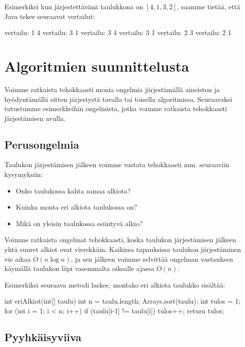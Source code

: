 Esimerkiksi kun järjestettävänä taulukkona on $[4,1,3,2]$,
saamme tietää, että Java tekee seuraavat vertailut:

\begin{code}
vertailu: 1 4
vertailu: 3 1
vertailu: 3 4
vertailu: 3 1
vertailu: 2 3
vertailu: 2 1
\end{code}

\section{Algoritmien suunnittelusta}

Voimme ratkaista tehokkaasti monia ongelmia järjestämällä
aineiston ja hyö\-dyntämällä sitten järjestystä tavalla tai toisella
algoritmissa.
Seuraavaksi tutustumme esimerkkeihin ongelmista, jotka voimme
ratkaista tehokkaasti järjes\-tämisen avulla.

\subsection{Perusongelmia}

Taulukon järjestämisen jälkeen voimme vastata tehokkaasti
mm. seuraaviin kysymyksiin:

\begin{itemize}
\item Onko taulukossa kahta samaa alkiota?
\item Kuinka monta eri alkiota taulukossa on?
\item Mikä on yleisin taulukossa esiintyvä alkio?
\end{itemize}

Voimme ratkaista ongelmat tehokkaasti, koska taulukon järjestämisen
jälkeen yhtä suuret alkiot ovat vierekkäin.
Kaikissa tapauksissa taulukon järjestäminen vie aikaa $O(n \log n)$,
ja sen jälkeen voimme selvittää ongelman vastauksen
käymällä taulukon läpi vasemmalta oikealle ajassa $O(n)$.

Esimerkiksi seuraava metodi laskee, montako eri alkiota
taulukko sisältää:

\begin{code}
int eriAlkiot(int[] taulu) {
    int n = taulu.length;
    Arrays.sort(taulu);
    int tulos = 1;
    for (int i = 1; i < n; i++) {
        if (taulu[i-1] != taulu[i]) tulos++;
    }
    return tulos;
}
\end{code}

\subsection{Pyyhkäisyviiva}

